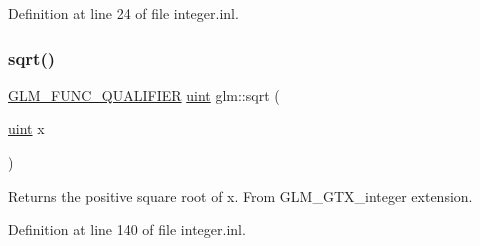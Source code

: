 Definition at line 24 of file integer.\+inl.

\mbox{\label{group__gtx__integer_ga457e9efca8339bf918d319e9c55f7c8f}} 
\subsubsection{\texorpdfstring{sqrt()}{sqrt()}\hspace{0.1cm}{\footnotesize\ttfamily [2/2]}}
{\footnotesize\ttfamily \hyperlink{setup_8hpp_a33fdea6f91c5f834105f7415e2a64407}{G\+L\+M\+\_\+\+F\+U\+N\+C\+\_\+\+Q\+U\+A\+L\+I\+F\+I\+ER} \hyperlink{group__core__precision_ga4fd29415871152bfb5abd588334147c8}{uint} glm\+::sqrt (\begin{DoxyParamCaption}\item[{\hyperlink{group__core__precision_ga4fd29415871152bfb5abd588334147c8}{uint}}]{x }\end{DoxyParamCaption})}

Returns the positive square root of x. From G\+L\+M\+\_\+\+G\+T\+X\+\_\+integer extension. 

Definition at line 140 of file integer.\+inl.

